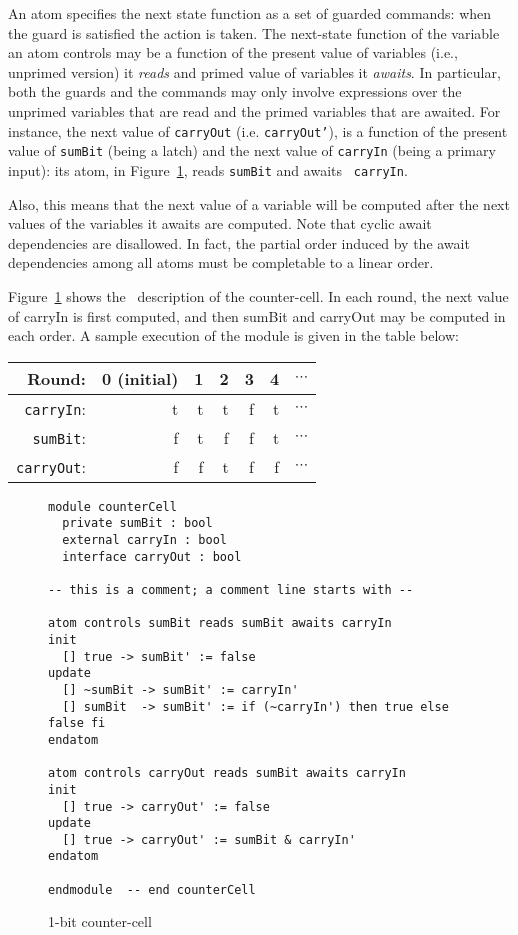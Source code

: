 An atom specifies the next state function as a set of guarded
commands: when the guard is satisfied the action is taken.  The
next-state function of the variable an atom controls may be a function
of the present value of variables (i.e., unprimed version) it {\em
reads} and primed value of variables it {\em awaits}. In particular,
both the guards and the commands may only involve expressions over the
unprimed variables that are read and the primed variables that are
awaited.  For instance, the next value of {\tt carryOut} (i.e. {\tt carryOut'}),
is a function of the present value of {\tt sumBit} (being a latch) and the
next value of {\tt carryIn} (being a primary input): its atom, in
Figure~\ref{fig:counter_cell_rm}, reads {\tt sumBit} and awaits {\tt
carryIn}. 

Also, this means that the next value of a variable will be computed
after the next values of the variables it awaits are computed.
Note that cyclic await dependencies are disallowed.
In fact, the partial order induced by the await dependencies among all atoms
must be completable to a linear order.

Figure~\ref{fig:counter_cell_rm} shows the \rem\ description of the
counter-cell. In each round, the next value of carryIn is first
computed, and then sumBit and carryOut may be computed in each order. 
A sample execution of the module is given in the table below:

\begin{center}
\begin{tabular}{r|rrrrrc}
Round: 
 & 0 (initial) & 1 & 2 & 3 & 4 & $\cdots$ \\ \hline
{\tt carryIn}:  & {\sc t} & {\sc t} & {\sc t} & {\sc f} & {\sc t} & $\cdots$ \\
{\tt sumBit}:  & {\sc f} & {\sc t} & {\sc f} & {\sc f} & {\sc t} & $\cdots$ \\
{\tt carryOut}:   & {\sc f} & {\sc f} & {\sc t} & {\sc f} & {\sc f} & $\cdots$ \\ \hline
\end{tabular}
\end{center}

\begin{figure}
\begin{verbatim}
module counterCell
  private sumBit : bool
  external carryIn : bool
  interface carryOut : bool

-- this is a comment; a comment line starts with --

atom controls sumBit reads sumBit awaits carryIn 
init
  [] true -> sumBit' := false
update
  [] ~sumBit -> sumBit' := carryIn'
  [] sumBit  -> sumBit' := if (~carryIn') then true else false fi
endatom

atom controls carryOut reads sumBit awaits carryIn
init
  [] true -> carryOut' := false
update
  [] true -> carryOut' := sumBit & carryIn'
endatom

endmodule  -- end counterCell

\end{verbatim}
\caption{1-bit counter-cell}
\label{fig:counter_cell_rm}
\end{figure}


